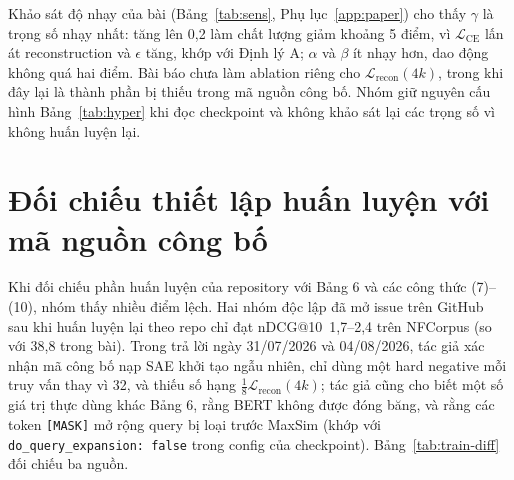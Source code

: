 \documentclass[a4paper,13pt]{extreport}
\makeatletter
\theoremstyle{plain}
\newcommand{\ndcg}{nDCG@10}
\makeatother
\begin{document}
Khảo sát độ nhạy của bài (Bảng~\ref{tab:sens}, Phụ lục~\ref{app:paper}) cho thấy $\gamma$ là trọng số nhạy nhất: tăng lên 0,2 làm chất lượng giảm khoảng 5 điểm, vì $\mathcal{L}_{\mathrm{CE}}$ lấn át reconstruction và $\epsilon$ tăng, khớp với Định lý A; $\alpha$ và $\beta$ ít nhạy hơn, dao động không quá hai điểm. Bài báo chưa làm ablation riêng cho $\mathcal{L}_{\mathrm{recon}}(4k)$, trong khi đây lại là thành phần bị thiếu trong mã nguồn công bố. Nhóm giữ nguyên cấu hình Bảng~\ref{tab:hyper} khi đọc checkpoint và không khảo sát lại các trọng số vì không huấn luyện lại.

\section{Đối chiếu thiết lập huấn luyện với mã nguồn công bố}
\label{sec:train-code}
Khi đối chiếu phần huấn luyện của repository với Bảng 6 và các công thức (7)--(10), nhóm thấy nhiều điểm lệch. Hai nhóm độc lập đã mở issue trên GitHub~\cite{ssrcode} sau khi huấn luyện lại theo repo chỉ đạt \ndcg\ 1,7--2,4 trên NFCorpus (so với 38,8 trong bài). Trong trả lời ngày 31/07/2026 và 04/08/2026, tác giả xác nhận mã công bố nạp SAE khởi tạo ngẫu nhiên, chỉ dùng một hard negative mỗi truy vấn thay vì 32, và thiếu số hạng $\tfrac18\mathcal{L}_{\mathrm{recon}}(4k)$; tác giả cũng cho biết một số giá trị thực dùng khác Bảng 6, rằng BERT không được đóng băng, và rằng các token \texttt{[MASK]} mở rộng query bị loại trước MaxSim (khớp với \texttt{do\_query\_expansion: false} trong config của checkpoint). Bảng~\ref{tab:train-diff} đối chiếu ba nguồn.
\end{document}
